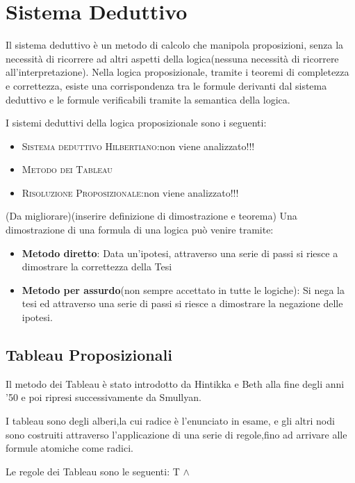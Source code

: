 \section{Sistema Deduttivo}
Il sistema deduttivo è un metodo di calcolo che manipola proposizioni, senza la
necessità di ricorrere ad altri aspetti della logica(nessuna necessità di ricorrere all'interpretazione).\newline
Nella logica proposizionale, tramite i teoremi di completezza e correttezza, esiste
una corrispondenza tra le formule derivanti dal sistema deduttivo e le formule verificabili
tramite la semantica della logica.

I sistemi deduttivi della logica proposizionale sono i seguenti:

\begin{itemize}
  \item \textsc{Sistema deduttivo Hilbertiano}:non viene analizzato!!!
  \item \textsc{Metodo dei Tableau}
  \item \textsc{Risoluzione Proposizionale}:non viene analizzato!!!
\end{itemize}

(Da migliorare)(inserire definizione di dimostrazione e teorema)
Una dimostrazione di una formula di una logica può venire tramite:

\begin{itemize}
  \item  \textbf{Metodo diretto}: Data un'ipotesi, attraverso una serie di passi
          si riesce a dimostrare la correttezza della Tesi
  \item \textbf{Metodo per assurdo}(non sempre accettato in tutte le logiche):
        Si nega la tesi ed attraverso una serie di passi si riesce a dimostrare
        la negazione delle ipotesi.
\end{itemize}

\subsection{Tableau Proposizionali}
Il metodo dei Tableau è stato introdotto da Hintikka e Beth alla fine degli anni '50
e poi ripresi successivamente da Smullyan.

I tableau sono degli alberi,la cui radice è l'enunciato in esame, e gli altri nodi
sono costruiti attraverso l'applicazione di una serie di regole,fino ad arrivare
alle formule atomiche come radici.

Le regole dei Tableau sono le seguenti:\newline
T $\land$

